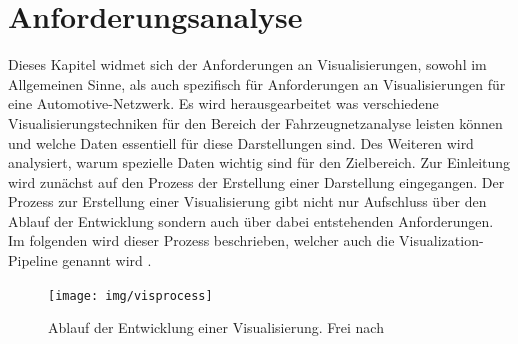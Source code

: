 \documentclass[draft=false
              ,paper=a4
              ,twoside=false
              ,fontsize=11pt
              ,headsepline
              ,BCOR10mm
              ,DIV11
              ]{scrbook}
\begin{document}
\chapter{Anforderungsanalyse} %
\label{cha:anforderungsanalyse}
Dieses Kapitel widmet sich der Anforderungen an Visualisierungen, sowohl im Allgemeinen Sinne, als auch spezifisch für Anforderungen an Visualisierungen für eine Automotive-Netzwerk. Es wird herausgearbeitet was verschiedene Visualisierungstechniken für den Bereich der Fahrzeugnetzanalyse leisten können und welche Daten essentiell für diese Darstellungen sind. Des Weiteren wird analysiert, warum spezielle Daten wichtig sind für den Zielbereich. Zur Einleitung wird zunächst auf den Prozess der Erstellung einer Darstellung eingegangen. Der Prozess zur Erstellung einer Visualisierung gibt nicht nur Aufschluss über den Ablauf der Entwicklung sondern auch über dabei entstehenden Anforderungen. Im folgenden wird dieser Prozess beschrieben, welcher auch die Visualization-Pipeline genannt wird \cite{ward_interactive_2010}. 

\begin{figure}[htbp]
  \centering
  \texttt{[image: img/visprocess]}
  \caption{Ablauf der Entwicklung einer Visualisierung. Frei nach \cite{card_readings_1999}}
  \label{fig:visprocess}
\end{figure}
\end{document}
